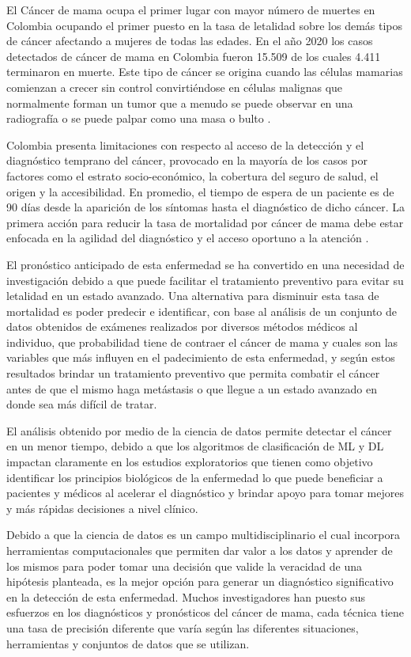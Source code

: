 El Cáncer de mama ocupa el primer lugar con mayor número de muertes en Colombia ocupando el primer puesto en la tasa de letalidad sobre los demás tipos de cáncer afectando a mujeres de todas las edades. En el año 2020 los casos detectados de cáncer de mama en Colombia fueron 15.509 de los cuales 4.411 terminaron en muerte\citep{InternationalAgencyforResearchonCancer2020}. Este tipo de cáncer se origina cuando las células mamarias comienzan a crecer sin control convirtiéndose en células malignas que normalmente forman un tumor que a menudo se puede observar en una radiografía o se puede palpar como una masa o bulto \citep{Sauer2019}.

Colombia presenta limitaciones con respecto al acceso de la detección y el diagnóstico temprano del cáncer, provocado en la mayoría de los casos por factores como el estrato socio-económico, la cobertura del seguro de salud, el origen y la accesibilidad. En promedio, el tiempo de espera de un paciente es de 90 días desde la aparición de los síntomas hasta el diagnóstico de dicho cáncer. La primera acción para reducir la tasa de mortalidad por cáncer de mama debe estar enfocada en la agilidad del diagnóstico y el acceso oportuno a la atención \citep{Duarte2021}. 

El pronóstico anticipado de esta enfermedad se ha convertido en una necesidad de investigación debido a que puede facilitar el tratamiento preventivo para evitar su letalidad en un estado avanzado. Una alternativa para disminuir esta tasa de mortalidad es poder predecir e identificar, con base al análisis de un conjunto de datos obtenidos de exámenes realizados por diversos métodos médicos al individuo, que probabilidad tiene de contraer el cáncer de mama y cuales son las variables que más influyen en el padecimiento de esta enfermedad,  y según estos resultados brindar un tratamiento preventivo que permita combatir el cáncer antes de que el mismo haga metástasis o que llegue a un estado avanzado en donde sea más difícil de tratar. 

El análisis obtenido por medio de la ciencia de datos permite detectar el cáncer en un menor tiempo, debido a que los algoritmos de clasificación de ML y DL impactan claramente en los estudios exploratorios que tienen como objetivo identificar los principios biológicos de la enfermedad lo que puede beneficiar a pacientes y médicos al acelerar el diagnóstico y brindar apoyo para tomar mejores y más rápidas decisiones a nivel clínico\cite{Turin2020}. 

Debido a que la ciencia de datos es un campo multidisciplinario el cual incorpora herramientas computacionales que permiten dar valor a los datos y aprender de los mismos para poder tomar una decisión que valide la veracidad de una hipótesis planteada, es la mejor opción para generar un diagnóstico significativo en la detección de esta enfermedad. Muchos investigadores han puesto sus esfuerzos en los diagnósticos y pronósticos del cáncer de mama, cada técnica tiene una tasa de precisión diferente que varía según las diferentes situaciones, herramientas y conjuntos de datos que se utilizan. 

